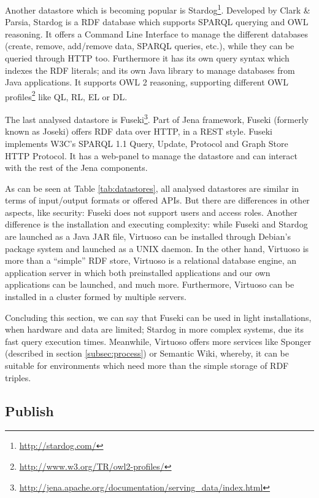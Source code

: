 Another datastore which is becoming popular is Stardog\footnote{\url{http://stardog.com/}}. Developed by Clark \& Parsia, Stardog is a RDF database which supports SPARQL querying and OWL reasoning. It offers a Command Line Interface to manage the different databases (create, remove, add/remove data, SPARQL queries, etc.), while they can be queried through HTTP too. Furthermore it has its own query syntax which indexes the RDF literals; and its own Java library to manage databases from Java applications. It supports OWL 2 reasoning, supporting different OWL profiles\footnote{\url{http://www.w3.org/TR/owl2-profiles/}} like QL, RL, EL or DL.

The last analysed datastore is Fuseki\footnote{\url{http://jena.apache.org/documentation/serving_data/index.html}}. Part of Jena framework, Fuseki (formerly known as Joseki) offers RDF data over HTTP, in a REST style. Fuseki implements W3C's SPARQL 1.1 Query, Update, Protocol and Graph Store HTTP Protocol. It has a web-panel to manage the datastore and can interact with the rest of the Jena components.

As can be seen at Table \ref{tab:datastores}, all analysed datastores are similar in terms of input/output formats or offered APIs. But there are differences in other aspects, like security: Fuseki does not support users and access roles. Another difference is the installation and executing complexity: while Fuseki and Stardog are launched as a Java JAR file, Virtuoso can be installed through Debian's package system and launched as a UNIX daemon. In the other hand, Virtuoso is more than a ``simple'' RDF store, Virtuoso is a relational database engine, an application server in which both preinstalled applications and our own applications can be launched, and much more. Furthermore, Virtuoso can be installed in a cluster formed by multiple servers.

Concluding this section, we can say that Fuseki can be used in light installations, when hardware and data are limited; Stardog in more complex systems, due its fast query execution times. Meanwhile, Virtuoso offers more services like Sponger (described in section \ref{subsec:process}) or Semantic Wiki, whereby, it can be suitable for environments which need more than the simple storage of RDF triples.


\subsection{Publish}\label{subsec:publish}


